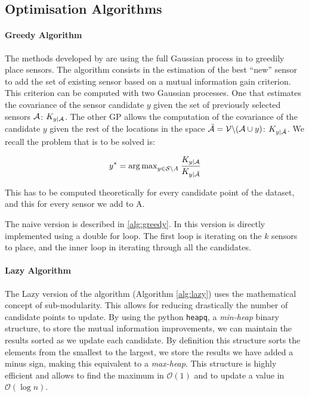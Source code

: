 \subsection{Optimisation Algorithms}

\paragraph{Greedy Algorithm}

The methods developed by \citet{krause_near-optimal_2008} are using the full Gaussian process in to greedily place sensors. The algorithm consists in the estimation of the best “new” sensor to add the set of existing sensor based on a mutual information gain criterion. This criterion can be computed with two Gaussian processes. One that estimates the covariance of the sensor candidate $y$ given the set of previously selected sensors $\mathcal{A}$: $K_{y | \mathcal{A}}$. The other GP allows the computation of the covariance of the candidate $y$ given the rest of the locations in the space $\bar{\mathcal{A}} = \mathcal{V} \backslash ( \mathcal{A} \cup y )$: $K_{y | \bar{\mathcal{A}}}$. We recall the problem that is to be solved is:

\begin{equation}
    y^* = {\arg \max}_{y \in \mathcal{S} \backslash A } \: \frac{K_{y | \mathcal{A}}}{K_{y | \bar{\mathcal{A}}}}
\end{equation}

This has to be computed theoretically for every candidate point of the dataset, and this for every sensor we add to A. 

The naive version is described in \ref{alg:greedy}. In this version is directly implemented using a double for loop. The first loop is iterating on the $k$ sensors to place, and the inner loop in iterating through all the candidates. 

\paragraph{Lazy Algorithm}

The Lazy version of the algorithm (Algorithm \ref{alg:lazy}) uses the mathematical concept of sub-modularity. This allows for reducing drastically the number of candidate points to update. By using the python \texttt{heapq}, a \textit{min-heap} binary structure, to store the mutual information improvements, we can maintain the results sorted as we update each candidate. By definition this structure sorts the elements from the smallest to the largest, we store the results we have added a minus sign, making this equivalent to a \textit{max-heap}. This structure is highly efficient and allows to find the maximum in $\mathcal{O}(1)$ and to update a value in $\mathcal{O}(\log n)$. 


